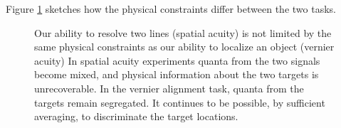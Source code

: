 Figure \ref{f6:LocalizationTheory} sketches how the
physical constraints differ between
the two tasks.
\begin{figure}
\centerline{
}
\caption[Localization:  Physical Constraints]{
Our ability to resolve two lines (spatial acuity)
is not limited by the same physical constraints as our
ability to localize an object (vernier acuity)
In spatial acuity experiments quanta from the
two signals become mixed, and physical information about
the two targets is unrecoverable.
In the vernier alignment task, quanta from the
targets remain segregated.
It continues to be possible, by
sufficient averaging, to discriminate the target locations.
}
\label{f6:LocalizationTheory}
\end{figure}

